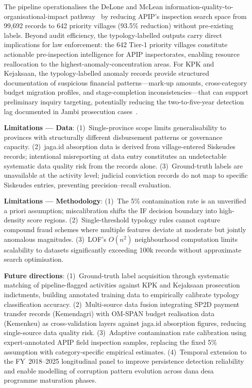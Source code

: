 \documentclass[3p,times,procedia]{elsarticle}
\begin{document}
The pipeline operationalises the DeLone and McLean information-quality-to-organisational-impact pathway~\cite{ref10} by reducing APIP's inspection search space from 99,692 records to 642 priority villages (93.5\% reduction) without pre-existing labels. Beyond audit efficiency, the typology-labelled outputs carry direct implications for law enforcement: the 642 Tier-1 priority villages constitute actionable pre-inspection intelligence for APIP inspectorates, enabling resource reallocation to the highest-anomaly-concentration areas. For KPK and Kejaksaan, the typology-labelled anomaly records provide structured documentation of suspicious financial patterns---mark-up amounts, cross-category budget migration profiles, and stage-completion inconsistencies---that can support preliminary inquiry targeting, potentially reducing the two-to-five-year detection lag documented in Jambi prosecution cases~\cite{ref30,ref31,ref32,ref33}.

\textbf{Limitations --- Data}: (1)~Single-province scope limits generalisability to provinces with structurally different disbursement patterns or governance capacity. (2)~jaga.id absorption data is derived from village-entered Siskeudes records; intentional misreporting at data entry constitutes an undetectable systematic data quality risk from the records alone. (3)~Ground-truth labels are unavailable at the activity level; judicial conviction records do not map to specific Siskeudes entries, preventing precision--recall evaluation.

\textbf{Limitations --- Methodology}: (1)~The 5\% contamination rate is an unverified a priori assumption; miscalibration shifts the IF decision boundary into high-density score regions. (2)~Single-threshold typology rules cannot capture compound fraud schemes where multiple features deviate at moderate but jointly anomalous magnitudes. (3)~LOF's $O(n^2)$ neighbourhood computation limits scalability to datasets significantly exceeding 100k records without approximate search optimisation.

\textbf{Future directions}: (1)~Ground-truth label acquisition through systematic matching of pipeline-flagged activities against KPK and Kejaksaan prosecution indictments, building annotated training data to empirically calibrate typology classification accuracy. (2)~Multi-source data fusion integrating SP2D payment transfer records (Kemendagri) with OM-SPAN budget realisation data (Kemenkeu) as cross-validation layers against jaga.id absorption figures, reducing single-source data quality risk. (3)~Adaptive contamination rate calibration using expert-annotated APIP field inspection samples, replacing the fixed 5\% assumption with category-specific empirical estimates. (4)~Temporal extension to the FY~2018--2025 longitudinal panel to improve persistence detection reliability and enable modelling of corruption pattern evolution across dana desa programme maturation phases.
\end{document}
